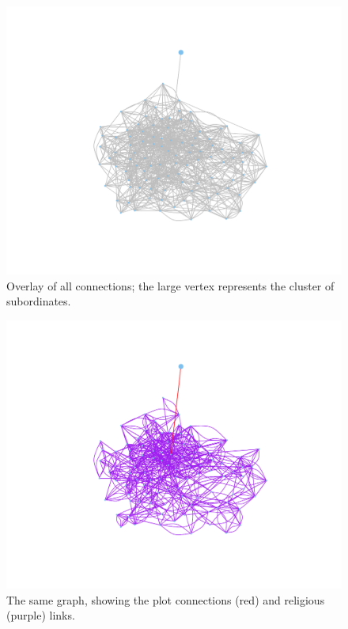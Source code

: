 \documentclass{article}
\newenvironment{rnwfig}[0]{\begin{figure}\begin{center}}{\end{center}\end{figure}}
\begin{document}
\begin{rnwfig}
\includegraphics{manuscript-all}
\caption{Overlay of all connections; the large vertex represents the cluster of subordinates.}
\end{rnwfig}

\begin{rnwfig}
\includegraphics{manuscript-religion}
\caption{The same graph, showing the plot connections (red) and religious (purple) links.}
\end{rnwfig}
\end{document}
